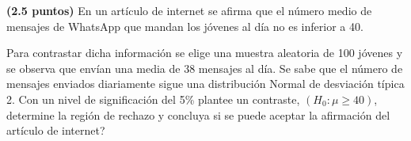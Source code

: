 
\textbf{(2.5 puntos)} En un artículo de internet se afirma que el número medio de mensajes de WhatsApp que mandan los jóvenes al día no es inferior a 40.

Para contrastar dicha información se elige una muestra aleatoria de 100 jóvenes y se observa que envían una media de 38 mensajes al día. Se sabe que el número de mensajes enviados diariamente sigue una distribución Normal de desviación típica 2. Con un nivel de significación del 5\% plantee un contraste, $(H_0:\mu\geq 40)$, determine la región de rechazo y concluya si \textquestiondown{}se puede aceptar la afirmación del artículo de internet?
